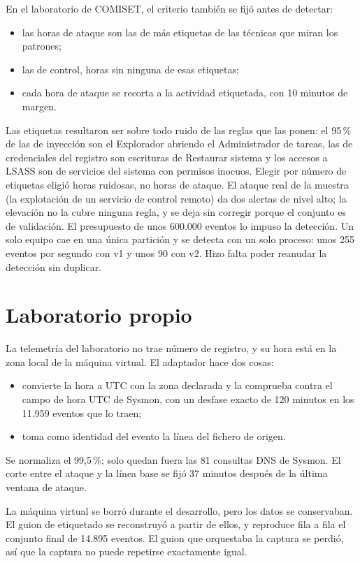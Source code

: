 En el laboratorio de COMISET, el criterio también se fijó antes de detectar:
\begin{itemize}
    \item las horas de ataque son las de más etiquetas de las técnicas que miran los patrones;
    \item las de control, horas sin ninguna de esas etiquetas;
    \item cada hora de ataque se recorta a la actividad etiquetada, con 10 minutos de margen.
\end{itemize}
Las etiquetas resultaron ser sobre todo ruido de las reglas que las ponen: el 95\,\% de las de
inyección son el Explorador abriendo el Administrador de tareas, las de credenciales del registro son
escrituras de Restaurar sistema y los accesos a LSASS son de servicios del sistema con permisos
inocuos. Elegir por número de etiquetas eligió horas ruidosas, no horas de ataque. El ataque real de
la muestra (la explotación de un servicio de control remoto) da dos alertas de nivel alto; la
elevación no la cubre ninguna regla, y se deja sin corregir porque el conjunto es de validación. El
presupuesto de unos 600.000 eventos lo impuso la detección. Un solo equipo cae en una única
partición y se detecta con un solo proceso: unos 255 eventos por segundo con v1 y unos 90 con v2.
Hizo falta poder reanudar la detección sin duplicar.

\section{Laboratorio propio}

La telemetría del laboratorio no trae número de registro, y su hora está en la zona local de la
máquina virtual. El adaptador hace dos cosas:
\begin{itemize}
    \item convierte la hora a UTC con la zona declarada y la comprueba contra el campo de hora UTC
    de Sysmon, con un desfase exacto de 120 minutos en los 11.959 eventos que lo traen;
    \item toma como identidad del evento la línea del fichero de origen.
\end{itemize}
Se normaliza el 99,5\,\%; solo quedan fuera las 81 consultas DNS de Sysmon. El corte entre el ataque
y la línea base se fijó 37 minutos después de la última ventana de ataque.

La máquina virtual se borró durante el desarrollo, pero los datos se conservaban. El guion de
etiquetado se reconstruyó a partir de ellos, y reproduce fila a fila el conjunto final de 14.895
eventos. El guion que orquestaba la captura se perdió, así que la captura no puede repetirse
exactamente igual.

